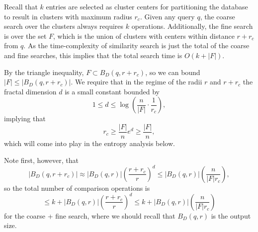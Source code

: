 \documentclass{amsbook}
\theoremstyle{definition}
\theoremstyle{remark}
\numberwithin{equation}{section}
\begin{document}
Recall that $k$ entries are selected as cluster centers for partitioning the database to result in clusters with maximum radius $r_c$.
Given any query $q$, the coarse search over the clusters always requires $k$ operations.
Additionally, the fine search is over the set $F$, which is the union of clusters with centers within distance $r+r_c$ from $q$.
As the time-complexity of similarity search is just the total of the coarse and fine searches, this implies that the total search time is $O(k + |F|)$.

By the triangle inequality, $F \subset B_D(q,r+r_c)$,
so we can bound $|F| \le |B_D(q,r+r_c)|$.
We require that in the regime of the radii $r$ and $r+r_c$ the fractal dimension $d$ is a small constant bounded by
\[
    1 \le d \le \log \left( \frac{n}{|F|} \cdot \frac{1}{r_c} \right), 
\]
implying that
\[
    r_c \ge \frac{|F|}{n} e^d \ge \frac{|F|}{n} ,
\]
which will come into play in the entropy analysis below.

Note first, however, that
\[
    \left|B_D(q, r+r_c)\right| \approx \left|B_D(q,r)\right|\left(\frac{r+r_c}{r}\right)^d  \le \left|B_D(q,r)\right| \left( \frac{n }{|F| r_c} \right) ,
\]
so the total number of comparison operations is 
\[
    \le k + |B_D(q,r)| \left( \frac{r+r_c}{r} \right)^d   \le k + |B_D(q,r)| \left( \frac{n}{|F|r_c} \right)
\]
for the coarse + fine search, where we should recall that $B_D(q,r)$ is the output size.


\end{document}
